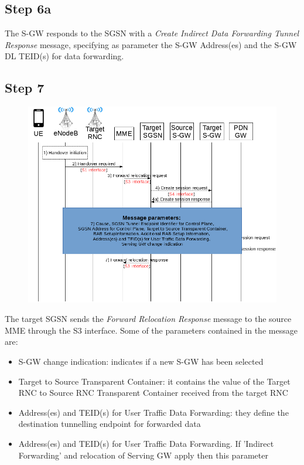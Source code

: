 \subsection*{Step 6a}
The S-GW responds to the SGSN with a \emph{Create Indirect Data Forwarding Tunnel
Response} message, specifying as parameter the S-GW Address(es) and
the S-GW DL TEID(s) for data forwarding.



\subsection*{Step 7}
\begin{figure}[!htb]
	\centering
	\includegraphics[width=0.9\linewidth]{img/7.png}
	\label{fig:7}
\end{figure}
The target SGSN sends the \emph{Forward Relocation Response} message
to the source MME through the S3 interface. Some of the parameters contained in
the message are:
\begin{itemize}
 \item S-GW change indication: indicates if a new S-GW has been selected
 \item Target to Source Transparent Container: it contains the value of the
  Target RNC to Source RNC Transparent Container received from the target RNC
 \item Address(es) and TEID(s) for User Traffic Data Forwarding: they define
 the destination tunnelling endpoint for forwarded data
 \item Address(es) and TEID(s) for User Traffic Data Forwarding. If 'Indirect
 Forwarding' and relocation of Serving GW apply then this parameter
\end{itemize}



